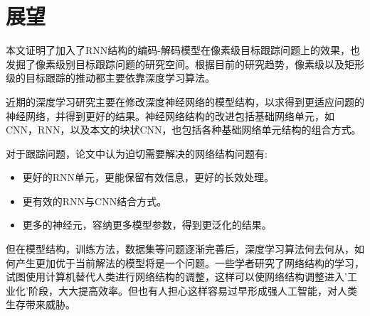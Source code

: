 \section{展望}
本文证明了加入了RNN结构的编码-解码模型在像素级目标跟踪问题上的效果，也发掘了像素级别目标跟踪问题的研究空间。根据目前的研究趋势，像素级以及矩形级的目标跟踪的推动都主要依靠深度学习算法。
\par
近期的深度学习研究主要在修改深度神经网络的模型结构，以求得到更适应问题的神经网络，并得到更好的结果。神经网络结构的改进包括基础网络单元，如CNN，RNN，以及本文的块状CNN，也包括各种基础网络单元结构的组合方式。
\par
对于跟踪问题，论文中认为迫切需要解决的网络结构问题有:
\begin{itemize}
    \item 更好的RNN单元，更能保留有效信息，更好的长效处理。
    \item 更有效的RNN与CNN结合方式。
    \item 更多的神经元，容纳更多模型参数，得到更泛化的结果。
\end{itemize}
\par
但在模型结构，训练方法，数据集等问题逐渐完善后，深度学习算法何去何从，如何产生更加优于当前解法的模型将是一个问题。一些学者研究了网络结构的学习\supercite{cortes2017adanet}，试图使用计算机替代人类进行网络结构的调整，这样可以使网络结构调整进入'工业化'阶段，大大提高效率。但也有人担心这样容易过早形成强人工智能\supercite{kurzweil2005singularity}，对人类生存带来威胁。

